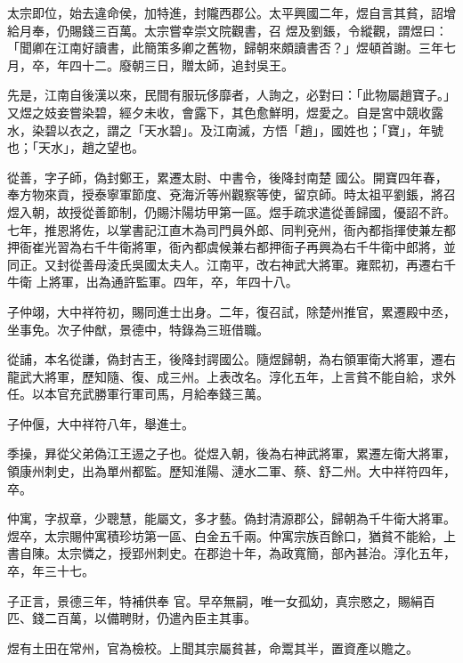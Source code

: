 \begin{pinyinscope}
 太宗即位，始去違命侯，加特進，封隴西郡公。太平興國二年，煜自言其貧，詔增給月奉，仍賜錢三百萬。太宗嘗幸崇文院觀書，召
 煜及劉鋹，令縱觀，謂煜曰：「聞卿在江南好讀書，此簡策多卿之舊物，歸朝來頗讀書否？」煜頓首謝。三年七月，卒，年四十二。廢朝三日，贈太師，追封吳王。



 先是，江南自後漢以來，民間有服玩侈靡者，人詢之，必對曰：「此物屬趙寶子。」又煜之妓妾嘗染碧，經夕未收，會露下，其色愈鮮明，煜愛之。自是宮中競收露水，染碧以衣之，謂之「天水碧」。及江南滅，方悟「趙」，國姓也；「寶」，年號也；「天水」，趙之望也。



 從善，字子師，偽封鄭王，累遷太尉、中書令，後降封南楚
 國公。開寶四年春，奉方物來貢，授泰寧軍節度、兗海沂等州觀察等使，留京師。時太祖平劉鋹，將召煜入朝，故授從善節制，仍賜汴陽坊甲第一區。煜手疏求遣從善歸國，優詔不許。七年，推恩將佐，以掌書記江直木為司門員外郎、同判兗州，衙內都指揮使兼左都押衙崔光習為右千牛衛將軍，衙內都虞候兼右都押衙子再興為右千牛衛中郎將，並同正。又封從善母淩氏吳國太夫人。江南平，改右神武大將軍。雍熙初，再遷右千牛衛
 上將軍，出為通許監軍。四年，卒，年四十八。



 子仲翊，大中祥符初，賜同進士出身。二年，復召試，除楚州推官，累遷殿中丞，坐事免。次子仲猷，景德中，特錄為三班借職。



 從誧，本名從謙，偽封吉王，後降封諤國公。隨煜歸朝，為右領軍衛大將軍，遷右龍武大將軍，歷知隨、復、成三州。上表改名。淳化五年，上言貧不能自給，求外任。以本官充武勝軍行軍司馬，月給奉錢三萬。



 子仲偃，大中祥符八年，舉進士。



 季操，昪從父弟偽江王逷之子也。從煜入朝，後為右神武將軍，累遷左衛大將軍，領康州刺史，出為單州都監。歷知淮陽、漣水二軍、蔡、舒二州。大中祥符四年，卒。



 仲寓，字叔章，少聰慧，能屬文，多才藝。偽封清源郡公，歸朝為千牛衛大將軍。煜卒，太宗賜仲寓積珍坊第一區、白金五千兩。仲寓宗族百餘口，猶貧不能給，上書自陳。太宗憐之，授郢州刺史。在郡迨十年，為政寬簡，部內甚治。淳化五年，卒，年三十七。



 子正言，景德三年，特補供奉
 官。早卒無嗣，唯一女孤幼，真宗愍之，賜絹百匹、錢二百萬，以備聘財，仍遣內臣主其事。



 煜有土田在常州，官為檢校。上聞其宗屬貧甚，命鬻其半，置資產以贍之。




\end{pinyinscope}

